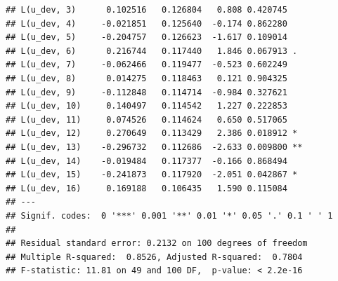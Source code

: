 \documentclass[
]{article}
\newenvironment{Shaded}{\begin{snugshade}}{\end{snugshade}}
\newcommand{\CommentTok}[1]{\textcolor[rgb]{0.56,0.35,0.01}{\textit{#1}}}
\newcommand{\ControlFlowTok}[1]{\textcolor[rgb]{0.13,0.29,0.53}{\textbf{#1}}}
\newcommand{\DataTypeTok}[1]{\textcolor[rgb]{0.13,0.29,0.53}{#1}}
\newcommand{\DecValTok}[1]{\textcolor[rgb]{0.00,0.00,0.81}{#1}}
\newcommand{\KeywordTok}[1]{\textcolor[rgb]{0.13,0.29,0.53}{\textbf{#1}}}
\newcommand{\NormalTok}[1]{#1}
\newcommand{\OperatorTok}[1]{\textcolor[rgb]{0.81,0.36,0.00}{\textbf{#1}}}
\newcommand{\OtherTok}[1]{\textcolor[rgb]{0.56,0.35,0.01}{#1}}
\newcommand{\StringTok}[1]{\textcolor[rgb]{0.31,0.60,0.02}{#1}}
\begin{document}
\begin{verbatim}
## L(u_dev, 3)      0.102516   0.126804   0.808 0.420745    
## L(u_dev, 4)     -0.021851   0.125640  -0.174 0.862280    
## L(u_dev, 5)     -0.204757   0.126623  -1.617 0.109014    
## L(u_dev, 6)      0.216744   0.117440   1.846 0.067913 .  
## L(u_dev, 7)     -0.062466   0.119477  -0.523 0.602249    
## L(u_dev, 8)      0.014275   0.118463   0.121 0.904325    
## L(u_dev, 9)     -0.112848   0.114714  -0.984 0.327621    
## L(u_dev, 10)     0.140497   0.114542   1.227 0.222853    
## L(u_dev, 11)     0.074526   0.114624   0.650 0.517065    
## L(u_dev, 12)     0.270649   0.113429   2.386 0.018912 *  
## L(u_dev, 13)    -0.296732   0.112686  -2.633 0.009800 ** 
## L(u_dev, 14)    -0.019484   0.117377  -0.166 0.868494    
## L(u_dev, 15)    -0.241873   0.117920  -2.051 0.042867 *  
## L(u_dev, 16)     0.169188   0.106435   1.590 0.115084    
## ---
## Signif. codes:  0 '***' 0.001 '**' 0.01 '*' 0.05 '.' 0.1 ' ' 1
## 
## Residual standard error: 0.2132 on 100 degrees of freedom
## Multiple R-squared:  0.8526, Adjusted R-squared:  0.7804 
## F-statistic: 11.81 on 49 and 100 DF,  p-value: < 2.2e-16
\end{verbatim}

\begin{Shaded}
\end{Shaded}
\end{document}
